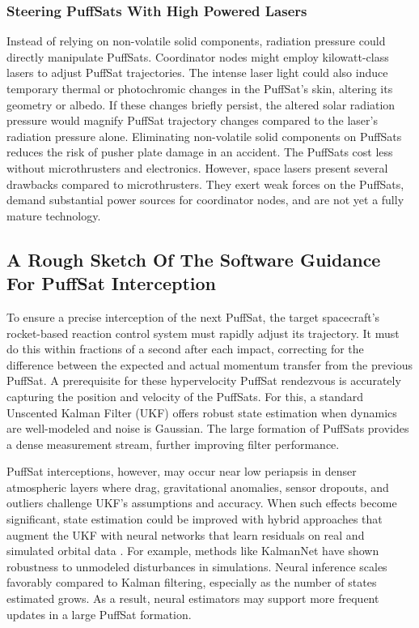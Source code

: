 \documentclass{article}
\begin{document}
\subsubsection{Steering PuffSats With High Powered Lasers}
Instead of relying on non-volatile solid components, radiation pressure could directly manipulate PuffSats. Coordinator nodes might employ kilowatt-class lasers to adjust PuffSat trajectories. The intense laser light could also induce temporary thermal or photochromic changes in the PuffSat's skin, altering its geometry or albedo. If these changes briefly persist, the altered solar radiation pressure would magnify PuffSat trajectory changes compared to the laser's radiation pressure alone. Eliminating non-volatile solid components on PuffSats  reduces the risk of pusher plate damage in an accident.  The PuffSats cost less without microthrusters and electronics. However, space lasers present several drawbacks compared to microthrusters. They exert weak forces on the PuffSats, demand substantial power sources for coordinator nodes, and are not yet a fully mature technology. 

\subsection{A Rough Sketch Of The Software Guidance For PuffSat Interception}\label{sec:neural_navigation}
To ensure a precise interception of the next PuffSat, the target spacecraft's rocket-based reaction control system must rapidly adjust its trajectory. It must do this within fractions of a second after each impact, correcting for the difference between the expected and actual momentum transfer from the previous PuffSat.  A prerequisite for these hypervelocity PuffSat rendezvous is accurately capturing the position and velocity of the PuffSats.  For this, a standard Unscented Kalman Filter (UKF) \cite{wan2000unscented} offers robust state estimation when dynamics are well-modeled and noise is Gaussian.  The large formation of PuffSats provides a dense measurement stream, further improving filter performance.  

PuffSat interceptions, however, may occur near low periapsis in denser atmospheric layers where drag, gravitational anomalies, sensor dropouts, and outliers challenge UKF's assumptions and accuracy.  When such effects become significant, state estimation could be improved with hybrid approaches that augment the UKF with neural networks that learn residuals on real and simulated orbital data \cite{takigawa2023comparison}.  For example, methods like KalmanNet \cite{revach_2022_kalmannet} \cite{revach2022unsupervised} have shown robustness to unmodeled disturbances in simulations.  Neural inference scales favorably compared to Kalman filtering, especially as the number of states estimated grows.  As a result, neural estimators may support more frequent updates in a large PuffSat formation.  
\end{document}
